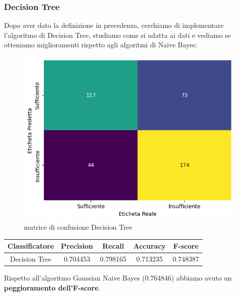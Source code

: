 \documentclass{article}
\begin{document}
\begin{titlepage}
        \subsubsection{Decision Tree}
        Dopo aver dato la definizione in precedenza, cerchiamo di implementare l'algoritmo di Decision Tree, studiamo come si adatta ai dati e vediamo se otteniamo miglioramenti rispetto agli algoritmi di Naive Bayes:

        \begin{figure}[ht]
            \centering
            \includegraphics[width=0.6\linewidth]{confusion_matrix-DT.png}
            \caption{  matrice di confusione Decision Tree}
            \label{fig:enter-label}
        \end{figure}
        \begin{center}
        \begin{tabular}{|c|c|c|c|c|}
            \hline
            \textbf{Classificatore} & \textbf{Precision} & \textbf{Recall} & \textbf{Accuracy}& \textbf{F-score}\\ \hline
            Decision Tree & 0.704453 & 0.798165 & 0.713235 & 0.748387\\ \hline
        \end{tabular}
        \end{center}
        Rispetto all'algoritmo Gaussian Naive Bayes (0.764846) abbiamo avuto un \textbf{peggioramento dell'F-score}.
        \newpage

\end{titlepage}
\end{document}
